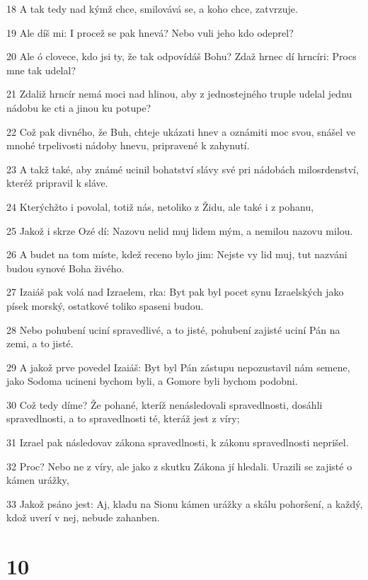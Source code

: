 \par 18 A tak tedy nad kýmž chce, smilovává se, a koho chce, zatvrzuje.
\par 19 Ale díš mi: I procež se pak hnevá? Nebo vuli jeho kdo odeprel?
\par 20 Ale ó clovece, kdo jsi ty, že tak odpovídáš Bohu? Zdaž hrnec dí hrncíri: Procs mne tak udelal?
\par 21 Zdaliž hrncír nemá moci nad hlinou, aby z jednostejného truple udelal jednu nádobu ke cti a jinou ku potupe?
\par 22 Což pak divného, že Buh, chteje ukázati hnev a oznámiti moc svou, snášel ve mnohé trpelivosti nádoby hnevu, pripravené k zahynutí.
\par 23 A takž také, aby známé ucinil bohatství slávy své pri nádobách milosrdenství, kteréž pripravil k sláve.
\par 24 Kterýchžto i povolal, totiž nás, netoliko z Židu, ale také i z pohanu,
\par 25 Jakož i skrze Ozé dí: Nazovu nelid muj lidem mým, a nemilou nazovu milou.
\par 26 A budet na tom míste, kdež receno bylo jim: Nejste vy lid muj, tut nazváni budou synové Boha živého.
\par 27 Izaiáš pak volá nad Izraelem, rka: Byt pak byl pocet synu Izraelských jako písek morský, ostatkové toliko spaseni budou.
\par 28 Nebo pohubení uciní spravedlivé, a to jisté, pohubení zajisté uciní Pán na zemi, a to jisté.
\par 29 A jakož prve povedel Izaiáš: Byt byl Pán zástupu nepozustavil nám semene, jako Sodoma ucineni bychom byli, a Gomore byli bychom podobni.
\par 30 Což tedy díme? Že pohané, kteríž nenásledovali spravedlnosti, dosáhli spravedlnosti, a to spravedlnosti té, kteráž jest z víry;
\par 31 Izrael pak následovav zákona spravedlnosti, k zákonu spravedlnosti neprišel.
\par 32 Proc? Nebo ne z víry, ale jako z skutku Zákona jí hledali. Urazili se zajisté o kámen urážky,
\par 33 Jakož psáno jest: Aj, kladu na Sionu kámen urážky a skálu pohoršení, a každý, kdož uverí v nej, nebude zahanben.

\chapter{10}

